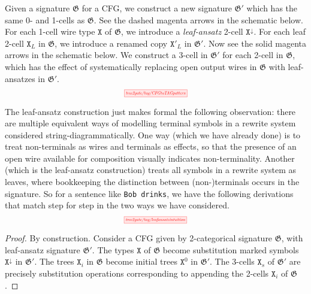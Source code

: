 \begin{fullwidth}
\begin{construction}
Given a signature $\mathfrak{G}$ for a CFG, we construct a new signature $\mathfrak{G}'$ which has the same 0- and 1-cells as $\mathfrak{G}$. See the dashed magenta arrows in the schematic below. For each 1-cell wire type $\texttt{X}$ of $\mathfrak{G}$, we introduce a \emph{leaf-ansatz} 2-cell $\texttt{X}^\downarrow$. For each leaf 2-cell $\texttt{X}_L$ in $\mathfrak{G}$, we introduce a renamed copy $\texttt{X}'_L$ in $\mathfrak{G}'$. Now see the solid magenta arrows in the schematic below. We construct a 3-cell in $\mathfrak{G}'$ for each 2-cell in $\mathfrak{G}$, which has the effect of systematically replacing open output wires in $\mathfrak{G}$ with leaf-ansatzes in $\mathfrak{G}'$.
\[\scalebox{0.5}{\tikzfig{tree2gate/tag/CFGtoTAGpattern}}\]
\end{construction}

\begin{example}
The leaf-ansatz construction just makes formal the following observation: there are multiple equivalent ways of modelling terminal symbols in a rewrite system considered string-diagrammatically. One way (which we have already done) is to treat non-terminals as wires and terminals as effects, so that the presence of an open wire available for composition visually indicates non-terminality. Another (which is the leaf-ansatz construction) treats all symbols in a rewrite system as leaves, where bookkeeping the distinction between (non-)terminals occurs in the signature. So for a sentence like \texttt{Bob drinks}, we have the following derivations that match step for step in the two ways we have considered.
\[\scalebox{0.5}{\tikzfig{tree2gate/tag/leafansatzintuition}}\]
\end{example}

\begin{proposition}\label{prop:cfgastag1}
\begin{proof}
By construction. Consider a CFG given by 2-categorical signature $\mathfrak{G}$, with leaf-ansatz signature $\mathfrak{G}'$. The types $\texttt{X}$ of $\mathfrak{G}$ become substitution marked symbols $\texttt{X}^{\downarrow}$ in $\mathfrak{G}'$. The trees $\texttt{X}_i$ in $\mathfrak{G}$ become initial trees $\texttt{X}^0$ in $\mathfrak{G}'$. The 3-cells $\texttt{X}_s$ of $\mathfrak{G}'$ are precisely substitution operations corresponding to appending the 2-cells $\texttt{X}_i$ of $\mathfrak{G}$.
\end{proof}
\end{proposition}


\end{fullwidth}
